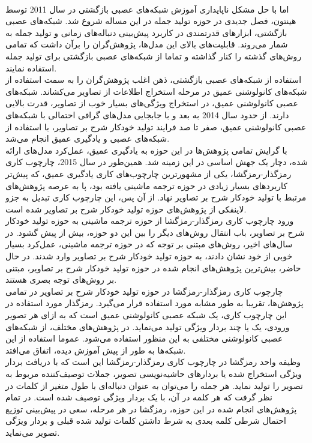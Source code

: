 \\
اما با حل مشکل ناپایداری آموزش شبکه‌های عصبی بازگشتی در سال 2011 توسط هینتون، فصل جدیدی در حوزه تولید جمله در این مساله شروع شد. شبکه‌های عصبی بازگشتی، ابزارهای قدرتمندی در کاربرد پیش‌بینی دنباله‌های زمانی و تولید جمله به شمار می‌روند. قابلیت‌های بالای این مدل‌ها، پژوهش‌گران را برآن داشت که تمامی روش‌های گذشته را کنار گذاشته و تماما از شبکه‌های عصبی بازگشتی برای تولید جمله استفاده نمایند.
\\
استفاده از شبکه‌های عصبی بازگشتی، ذهن اغلب پژوهش‌گران را به سمت استفاده از شبکه‌های کانولوشنی عمیق در مرحله استخراج اطلاعات از تصاویر می‌کشاند. شبکه‌های عصبی کانولوشنی عمیق، در استخراج ویژگی‌های بسیار خوب از تصاویر، قدرت بالایی دارند. از حدود سال 2014 به بعد و با جابجایی مدل‌های گرافی احتمالی با شبکه‌های عصبی کانولوشنی عمیق، صفر تا صد فرایند تولید خودکار شرح بر تصاویر، با استفاده از شبکه‌های عصبی و یادگیری عمیق انجام می‌شد.
\\
با گرایش تمامی پژوهش‌ها در این حوزه به یادگیری عمیق، عمل‌کرد مدل‌های ارائه شده، دچار یک جهش اساسی در این زمینه شد. همین‌طور در سال 2015،  چارچوب کاری رمزگذار-رمزگشا، یکی از مشهورترین چارچوب‌های کاری یادگیری عمیق، که پیش‌تر کاربردهای بسیار زیادی در حوزه ترجمه ماشینی یافته  بود، پا به عرصه پژوهش‌های مرتبط با تولید خودکار شرح بر تصاویر نهاد. از آن پس، این چارچوب کاری تبدیل به جزو لاینفکی از پژوهش‌های حوزه تولید خودکار شرح بر تصاویر شده است.
\\
ورود چارچوب کاری رمزگذار-رمزگشا از حوزه ترجمه ماشینی به حوزه تولید خودکار شرح بر تصاویر، باب انتقال روش‌های دیگر را بین این دو حوزه، بیش از پیش گشود. در سال‌های اخیر، روش‌های مبتنی بر توجه که در حوزه ترجمه ماشینی، عمل‌کرد بسیار خوبی از خود نشان دادند، به حوزه تولید خودکار شرح بر تصاویر وارد شدند. در حال حاضر، بیش‌ترین پژوهش‌های انجام شده در حوزه تولید خودکار شرح بر تصاویر،‌ مبتنی بر روش‌های توجه بصری هستند.
\\
چارچوب کاری رمزگذار-رمزگشا در حوزه تولید خودکار شرح بر تصاویر در تمامی پژوهش‌ها، تقریبا به طور مشابه مورد استفاده قرار می‌گیرد. رمزگذار مورد استفاده در این چارچوب کاری، یک شبکه عصبی کانولوشنی عمیق است که به‌ ازای هر تصویر ورودی،‌ یک یا چند بردار ویژگی تولید می‌نماید. در پژوهش‌های مختلف، از شبکه‌های عصبی کانولوشنی مختلفی به این منظور استفاده می‌شود. عموما استفاده از این شبکه‌ها به طور از پیش آموزش دیده، اتفاق می‌افتد.
\\
وظیفه واحد رمزگشا در چارچوب کاری رمزگذار-رمزگشا این است که با دریافت  بردار ویژگی استخراج شده یا بردارهای حاشیه‌نویسی تصویر، جملات توصیف‌کننده مربوط به تصویر را تولید نماید. هر جمله را می‌توان به عنوان دنباله‌ای با طول متغیر از کلمات در نظر گرفت که هر کلمه در آن، با یک بردار ویژگی توصیف شده است. در تمام پژوهش‌های انجام شده در این حوزه،‌ رمزگشا در هر مرحله،‌ سعی در پیش‌بینی توزیع احتمال شرطی کلمه بعدی به شرط داشتن کلمات تولید شده قبلی و بردار ویژگی تصویر می‌نماید. 
